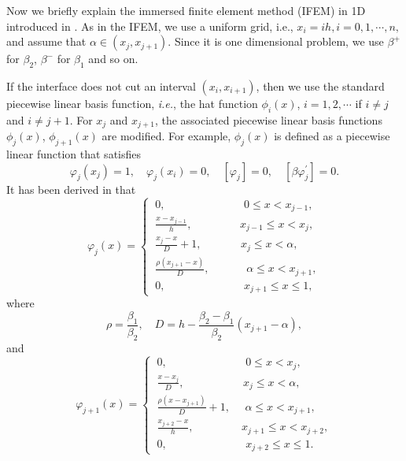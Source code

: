 \documentclass[11pt]{article}
\numberwithin{equation}{section}
\begin{document}
Now we briefly explain the immersed finite element method (IFEM) in 1D introduced in \cite{li1998immersed}.
As in the IFEM, we use a uniform grid, i.e., $x_{i}=ih, i=0, 1,\cdots, n, $
and assume that $\alpha \in \left(x_{j}, x_{j+1}\right)$.
Since it is one dimensional problem,
 we use $\beta^+$ for $\beta_2$, $\beta^-$ for $\beta_1$ and so on.

If the interface does not cut an interval $(x_i,x_{i+1})$,
then we use the standard piecewise linear basis function, \emph{i.e.},
the hat function $\phi_i(x)$, $i=1,2, \cdots$ if $i\neq j$ and $i\neq j+1$.
For $x_{j}$ and $x_{j+1}$, the associated piecewise linear basis functions $\phi_j(x)$, $\phi_{j+1}(x)$ are modified.
For example, $\phi_j(x)$ is defined as a piecewise linear function that satisfies
\begin{equation*}\label{}
 \varphi_j(x_j) = 1, \quad \varphi_j(x_i)=0, \quad   \left[\varphi_{j}\right]=0,\quad\left[\beta \varphi^{'}_{j}\right]=0.
\end{equation*}
It has been derived in \cite{li2006immersed} that
\begin{equation*}\label{}
\varphi_{j}\left(x\right)=
\begin{cases}
 ~0  ,\qquad \qquad \qquad~~~~~0\leq x <x_{j-1},\\
   ~\frac{x-x_{j-1}}{h} ,\qquad \quad~~~~~~x_{j-1}\leq x < x_{j},\\
  ~ \frac{x_{j}-x}{D}+1 ,\qquad ~~~~~~~x_{j}\leq x < \alpha,\\
 ~ \frac{\rho \left(x_{j+1}-x\right)}{D} ,\qquad ~~~~~~\alpha\leq x < x_{j+1},\\
 ~0  ,\qquad \qquad \qquad~~~~~x_{j+1}\leq x \leq 1,
\end{cases}
\end{equation*}
where
\begin{equation*}\label{}
\rho =\frac{\beta_{1}}{\beta_{2}},\quad D=h-\frac{\beta_{2}-\beta_{1}}{\beta_{2}}\left(x_{j+1}-\alpha\right),
\end{equation*}
and
\begin{equation*}\label{}
\varphi_{j+1}\left(x\right)=
\begin{cases}
 ~0  ,\qquad \qquad \qquad~~~~~0\leq x <x_{j},\\
   ~\frac{x-x_{j}}{D} ,\qquad \quad\quad~~~~~~x_{j}\leq x < \alpha,\\
  ~ \frac{\rho \left(x-x_{j+1}\right)}{D}+1 , ~~~~~~\alpha\leq x < x_{j+1},\\
  ~ \frac{x_{j+2}-x}{h}  ,\qquad \quad~~~~~~x_{j+1}\leq x < x_{j+2},\\
  ~0  ,\qquad \qquad \qquad~~~~~x_{j+2}\leq x \leq 1.
\end{cases}
\end{equation*}
\end{document}
